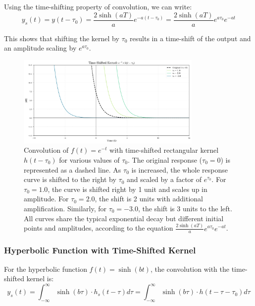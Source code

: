 	Using the time-shifting property of convolution, we can write:
	\begin{equation}
		y_s(t) = y(t-\tau_0) = \frac{2\sinh(aT)}{a}e^{-a(t-\tau_0)} = \frac{2\sinh(aT)}{a}e^{a\tau_0}e^{-at}
	\end{equation}
	
	This shows that shifting the kernel by $\tau_0$ results in a time-shift of the output and an amplitude scaling by $e^{a\tau_0}$.
	
	\begin{figure}[htbp]
		\centering
		\includegraphics[width=0.8\textwidth]{figs/exp_time_shift_extended.png}
		\caption{Convolution of $f(t) = e^{-t}$ with time-shifted rectangular kernel $h(t-\tau_0)$ for various values of $\tau_0$. The original response ($\tau_0 = 0$) is represented as a dashed line. As $\tau_0$ is increased, the whole response curve is shifted to the right by $\tau_0$ and scaled by a factor of $e^{\tau_0}$. For $\tau_0 = 1.0$, the curve is shifted right by 1 unit and scales up in amplitude. For $\tau_0 = 2.0$, the shift is 2 units with additional amplification. Similarly, for $\tau_0 = -3.0$, the shift is 3 units to the left. All curves share the typical exponential decay but different initial points and amplitudes, according to the equation $\frac{2\sinh(aT)}{a}e^{a\tau_0}e^{-at}$.}
		\label{fig:exp_shifted_kernel}
	\end{figure}
	
	\subsubsection{Hyperbolic Function with Time-Shifted Kernel}
	For the hyperbolic function $f(t) = \sinh(bt)$, the convolution with the time-shifted kernel is:
	\begin{equation}
		y_s(t) = \int_{-\infty}^{\infty} \sinh(b\tau) \cdot h_s(t - \tau) d\tau = \int_{-\infty}^{\infty} \sinh(b\tau) \cdot h(t - \tau - \tau_0) d\tau
	\end{equation}
	
